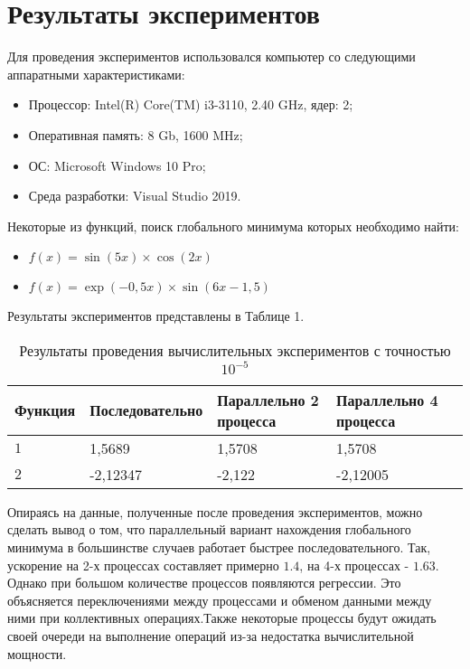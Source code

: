 \documentclass{report}
\begin{document}
\section*{Результаты экспериментов}
Для проведения экспериментов использовался компьютер со следующими аппаратными характеристиками:
\begin{itemize}
\item Процессор: Intel(R) Core(TM) i3-3110, 2.40 GHz, ядер: 2;
\item Оперативная память: 8 Gb, 1600 MHz;
\item ОС: Microsoft Windows 10 Pro;
\item Среда разработки: Visual Studio 2019.
\end{itemize}

\par Некоторые из функций, поиск глобального минимума которых необходимо найти:\par
\begin{itemize}
\item $f(x) = \sin(5x)\times{}\cos(2x) $
\item $f(x) = \exp(-0,5x)\times{}\sin(6x-1,5) $
\end{itemize}
\par Результаты экспериментов представлены в Таблице 1.

\begin{table}[!h]
\caption{Результаты проведения вычислительных экспериментов с точностью $10^{-5}$}\par
\centering
\begin{tabular}{|l|l|l|l|l|}
\hline
Функция & Последовательно & Параллельно 2 процесса & Параллельно 4 процесса  \\ \hline
$1$        & 1,5689        & 1,5708     & 1,5708      \\
$2$        & -2,12347         & -2,122     & -2,12005       \\
\hline
\end{tabular}
\end{table}

\par Опираясь на данные, полученные после проведения экспериментов, можно сделать вывод о том, что параллельный вариант нахождения глобального минимума в большинстве случаев работает быстрее последовательного. Так, ускорение на 2-х процессах составляет примерно $1.4$, на 4-х процессах - $1.63$. Однако при большом количестве процессов появляются регрессии. Это объясняется переключениями между процессами и обменом данными между ними при коллективных операциях.Также некоторые процессы будут ожидать своей очереди на выполнение операций из-за недостатка вычислительной мощности.
\end{document}
